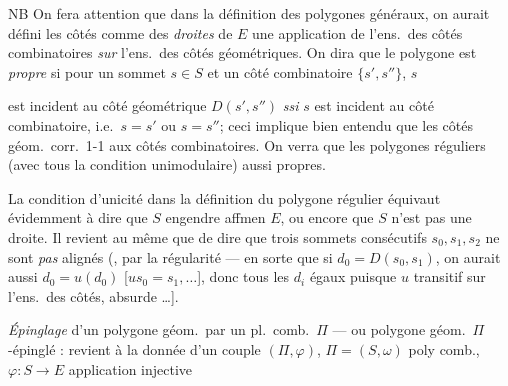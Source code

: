 \documentclass[11pt,a4paper]{article}
\begin{document}
NB On fera attention que dans la définition des polygones généraux, on
aurait défini les côtés comme des \emph{droites} de $E$ \ill{} une
application  de l'ens.\ des côtés combinatoires
\emph{sur} l'ens.\ des côtés géométriques. On dira que le polygone est
\emph{propre} si pour un sommet $s \in S$ et un côté combinatoire
$\{s', s''\}$, $s$


est incident au côté géométrique $D(s', s'')$ \emph{ssi} $s$ est incident au
côté combinatoire, i.e.\ $s = s'$ ou $s = s''$; ceci implique bien entendu que
les côtés géom.\ corr.\ 1-1 aux côtés combinatoires. On verra que les
polygones réguliers (avec tous la condition unimodulaire)  aussi
propres.

\marginal{$\triangle$}
La condition d'unicité dans la définition du polygone régulier équivaut
évidemment à dire que $S$ engendre affmen $E$, ou
encore que $S$ n'est pas \struck{\ill{}}  une droite. Il
revient au même que de dire que trois sommets consécutifs $s_0, s_1, s_2$ ne
sont \emph{pas} alignés (, par la régularité — en sorte que si
$d_0 = D(s_0, s_1)$, on aurait aussi \struck{\ill{}} $d_0 = u(d_0)$
[$u s_0 = s_1, \dots$], donc tous les $d_i$ égaux puisque $u$ transitif sur
l'ens.\ des côtés, absurde …].

\emph{Épinglage} d'un polygone géom.\ par un pl.\ comb.\ $\Pi$ — ou polygone
géom.\ $\Pi$-épinglé : revient à la donnée d'un couple
\struck{\ill{}}$(\Pi, \varphi)$, $\Pi = (S, \omega)$ poly comb.,
$\varphi \colon S \to E$ application injective
\end{document}
